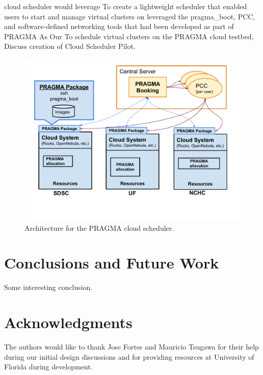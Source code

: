 \documentclass{acm_proc_article-sp}
\begin{document}
cloud scheduler would leverage 
To create a lightweight scheduler that enabled users to start and manage virtual clusters on leveraged the pragma\_boot, PCC, and software-defined networking tools that had been developed as part of PRAGMA 
As 
Our 
To schedule virtual clusters on the PRAGMA cloud testbed, 
Discuss creation of Cloud Scheduler Pilot.

\begin{figure}[htbp]
\begin{center}
\includegraphics[width=\columnwidth]{figures/arch.pdf}
\caption{Architecture for the PRAGMA cloud scheduler.}
\label{Fig:Arch}
\end{center}
\end{figure}


\section{Conclusions and Future Work}
\label{Sec:Conclusions}

Some interesting conclusion.

\section{Acknowledgments}

The authors would like to thank Jose Fortes and Mauricio Tsugawa for their help during our initial design discussions and for providing resources at University of Florida during development.


  
\end{document}
